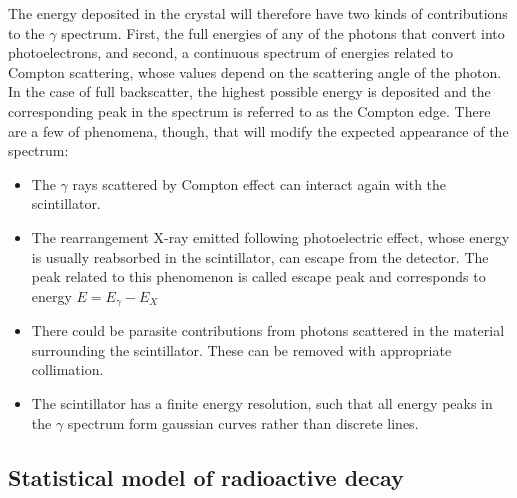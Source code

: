 The energy deposited in the crystal will therefore have two kinds of contributions to the $\gamma$ spectrum.
First, the full energies of any of the photons that convert into photoelectrons, 
and second, a continuous spectrum of energies related to Compton scattering, 
whose values depend on the scattering angle of the photon.
In the case of full backscatter, the highest possible energy is deposited
and the corresponding peak in the spectrum is referred to as the Compton edge.
There are a few of phenomena, though, that will modify the expected appearance of the spectrum:
\begin{itemize}
    \item The $\gamma$ rays scattered by Compton effect can interact again with the scintillator.
    \item The rearrangement X-ray emitted following photoelectric effect, whose energy is usually reabsorbed in the scintillator, can escape from the detector.
    The peak related to this phenomenon is called escape peak and corresponds to energy $E = E_{\gamma} - E_X$
    \item There could be parasite contributions from photons scattered in the material surrounding the scintillator. 
    These can be removed with appropriate collimation.
    \item The scintillator has a finite energy resolution, such that all energy peaks in the $\gamma$ spectrum form gaussian curves rather than discrete lines.
\end{itemize}

\subsection{Statistical model of radioactive decay}
\label{sec:statistics}



